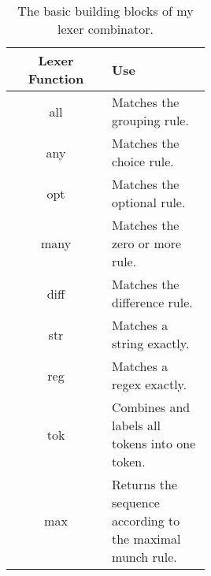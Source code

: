 \begin{table}
    \centering
    \begin{tabular}{c|p{0.5\linewidth}}
        Lexer Function & Use\\\hline
        all & Matches the grouping rule.\\
        any & Matches the choice rule.\\
        opt & Matches the optional rule.\\
        many & Matches the zero or more rule.\\
        diff & Matches the difference rule.\\
        str & Matches a string exactly.\\
        reg & Matches a regex exactly.\\
        tok & Combines and labels all tokens into one token.\\
        max & Returns the sequence according to the maximal munch rule.\\
    \end{tabular}
    \caption{The basic building blocks of my lexer combinator.}
    \label{tab:lexical-constructs}
\end{table}